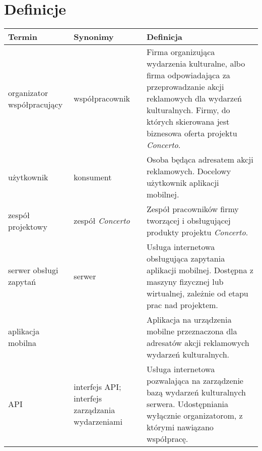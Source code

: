 \newpage
\section{Definicje}

\begin{longtable}{@{} p{} @{\hspace{0.05\textwidth}} p{} @{\hspace{0.05\textwidth}} p{} @{}}
    \toprule
    \textbf{Termin} & \textbf{Synonimy} & \textbf{Definicja} \\
    \toprule
    organizator współpracujący & współpracownik &
    Firma organizująca wydarzenia kulturalne, albo firma odpowiadająca za
    przeprowadzanie akcji reklamowych dla wydarzeń kulturalnych. Firmy, do
    których skierowana jest biznesowa oferta projektu \emph{Concerto}. \\
    \midrule
    użytkownik & konsument &
    Osoba będąca adresatem akcji reklamowych. Docelowy użytkownik aplikacji
    mobilnej. \\
    \midrule
    zespół projektowy & zespół \emph{Concerto} &
    Zespół pracowników firmy tworzącej i obsługującej produkty projektu
    \emph{Concerto}. \\
    \midrule
    serwer obsługi zapytań & serwer &
    Usługa internetowa obsługująca zapytania aplikacji mobilnej. Dostępna z
    maszyny fizycznej lub wirtualnej, zależnie od etapu prac nad projektem. \\
    \midrule
    aplikacja mobilna & &
    Aplikacja na urządzenia mobilne przeznaczona dla adresatów akcji
    reklamowych wydarzeń kulturalnych. \\
    \midrule
    API & interfejs API; interfejs zarządzania wydarzeniami &
    Usługa internetowa pozwalająca na zarządzenie bazą wydarzeń kulturalnych
    serwera. Udostępniania wyłącznie organizatorom, z którymi nawiązano
    współpracę. \\
    \bottomrule
\end{longtable}
